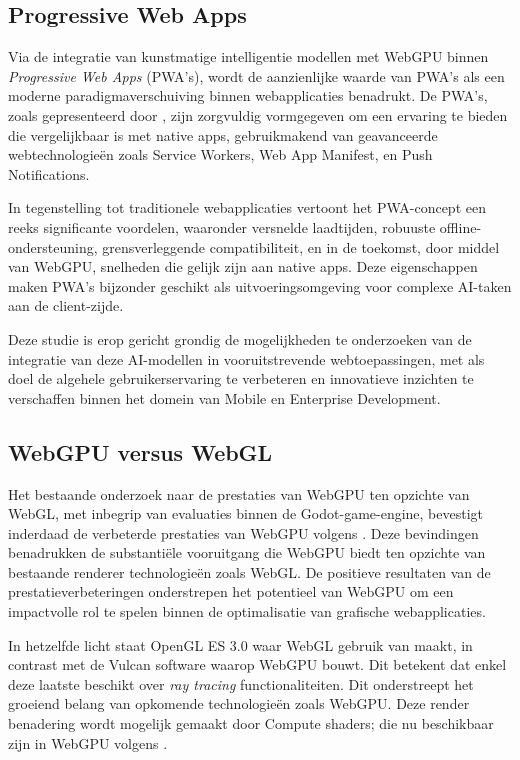 \subsection{Progressive Web Apps}
Via de integratie van kunstmatige intelligentie modellen met WebGPU binnen \textit{Progressive Web Apps} (PWA's), wordt de aanzienlijke waarde van PWA's als een moderne paradigmaverschuiving binnen webapplicaties benadrukt. 
\bigbreak{}
De PWA's, zoals gepresenteerd door \textcite{Shumylo2023a}, zijn zorgvuldig vormgegeven om een ervaring te bieden die vergelijkbaar is met native apps, gebruikmakend van geavanceerde webtechnologieën zoals Service Workers, Web App Manifest, en Push Notifications.

\bigbreak{}
In tegenstelling tot traditionele webapplicaties vertoont het PWA-concept een reeks significante voordelen, waaronder versnelde laadtijden, robuuste offline-ondersteuning, grens\-ver\-le\-ggen\-de compatibiliteit, en in de toekomst, door middel van WebGPU, snelheden die gelijk zijn aan native apps. Deze eigenschappen maken PWA's bijzonder geschikt als uitvoeringsomgeving voor  complexe AI-taken aan de client-zijde.

\bigbreak{}
Deze studie is erop gericht grondig de mogelijkheden te onderzoeken van de integratie van deze AI-modellen in voor\-uit\-stre\-ven\-de webtoepassingen, 
met als doel de algehele gebruikerservaring te verbeteren en innovatieve inzichten te verschaffen binnen het domein van Mobile en Enterprise Development.

\subsection{WebGPU versus WebGL}

Het bestaande onderzoek naar de prestaties van WebGPU ten opzichte van WebGL, met inbegrip van evaluaties binnen de Godot-game-engine, bevestigt inderdaad de verbeterde prestaties van WebGPU volgens \textcite{Fransson2023}. Deze bevindingen benadrukken de substantiële vooruitgang die WebGPU biedt ten opzichte van bestaande renderer technologieën zoals WebGL. De positieve resultaten van de prestatieverbeteringen onderstrepen het potentieel van WebGPU om een impactvolle rol te spelen binnen de optimalisatie van grafische webapplicaties.

\bigbreak{}
In hetzelfde licht staat OpenGL ES 3.0 waar WebGL gebruik van maakt, in contrast met de Vulcan software waarop WebGPU bouwt. Dit betekent dat enkel deze laatste beschikt over \textit{ray tracing} functionaliteiten. Dit onderstreept het groeiend belang van opkomende technologieën zoals Web\-GPU. Deze render benadering wordt mogelijk gemaakt door Compute shaders; die nu beschikbaar zijn in WebGPU volgens \textcite{Beaufort2023}.

